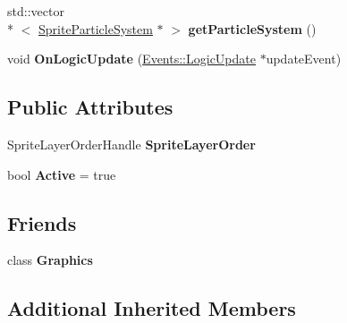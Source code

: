 \begin{DoxyCompactItemize}
\item 
\hypertarget{classDCEngine_1_1Components_1_1GraphicsSpace_a6ead5f0f7786357164a49d7fbe96a8d6}{std\-::vector\\*
$<$ \hyperlink{classDCEngine_1_1Components_1_1SpriteParticleSystem}{Sprite\-Particle\-System} $\ast$ $>$ {\bfseries get\-Particle\-System} ()}\label{classDCEngine_1_1Components_1_1GraphicsSpace_a6ead5f0f7786357164a49d7fbe96a8d6}

\item 
\hypertarget{classDCEngine_1_1Components_1_1GraphicsSpace_a605844447b72d8716a33c815f3d71d12}{void {\bfseries On\-Logic\-Update} (\hyperlink{classDCEngine_1_1Events_1_1LogicUpdate}{Events\-::\-Logic\-Update} $\ast$update\-Event)}\label{classDCEngine_1_1Components_1_1GraphicsSpace_a605844447b72d8716a33c815f3d71d12}

\end{DoxyCompactItemize}
\subsection*{Public Attributes}
\begin{DoxyCompactItemize}
\item 
\hypertarget{classDCEngine_1_1Components_1_1GraphicsSpace_a7308c43de5d70d71f08cd6278dd41101}{Sprite\-Layer\-Order\-Handle {\bfseries Sprite\-Layer\-Order}}\label{classDCEngine_1_1Components_1_1GraphicsSpace_a7308c43de5d70d71f08cd6278dd41101}

\item 
\hypertarget{classDCEngine_1_1Components_1_1GraphicsSpace_a7a6134e3ed9bca074564ad4c50cc2c29}{bool {\bfseries Active} = true}\label{classDCEngine_1_1Components_1_1GraphicsSpace_a7a6134e3ed9bca074564ad4c50cc2c29}

\end{DoxyCompactItemize}
\subsection*{Friends}
\begin{DoxyCompactItemize}
\item 
\hypertarget{classDCEngine_1_1Components_1_1GraphicsSpace_ae5cfe0c0e0b06d536d5814bd1ff4818f}{class {\bfseries Graphics}}\label{classDCEngine_1_1Components_1_1GraphicsSpace_ae5cfe0c0e0b06d536d5814bd1ff4818f}

\end{DoxyCompactItemize}
\subsection*{Additional Inherited Members}


